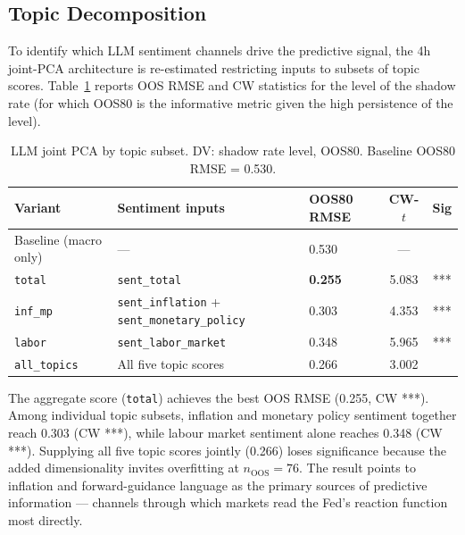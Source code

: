 \subsection{Topic Decomposition}

To identify which LLM sentiment channels drive the predictive signal, the 4h joint-PCA architecture is re-estimated restricting inputs to subsets of topic scores. Table~\ref{tab:topics} reports OOS RMSE and CW statistics for the level of the shadow rate (for which OOS80 is the informative metric given the high persistence of the level).

\begin{table}[ht]
\centering
\caption{LLM joint PCA by topic subset. DV: shadow rate level, OOS80. Baseline OOS80 RMSE = 0.530.}
\label{tab:topics}
\small
\begin{tabular}{lllcc}
\toprule
Variant & Sentiment inputs & OOS80 RMSE & CW-$t$ & Sig \\
\midrule
Baseline (macro only)    & —                                                  & 0.530 & —     &     \\
\texttt{total}           & \texttt{sent\_total}                               & \textbf{0.255} & 5.083 & *** \\
\texttt{inf\_mp}         & \texttt{sent\_inflation} + \texttt{sent\_monetary\_policy} & 0.303 & 4.353 & *** \\
\texttt{labor}           & \texttt{sent\_labor\_market}                       & 0.348 & 5.965 & *** \\
\texttt{all\_topics}     & All five topic scores                              & 0.266 & 3.002 &     \\
\bottomrule
\end{tabular}
\end{table}

The aggregate score (\texttt{total}) achieves the best OOS RMSE (0.255, CW ***). Among individual topic subsets, inflation and monetary policy sentiment together reach 0.303 (CW ***), while labour market sentiment alone reaches 0.348 (CW ***). Supplying all five topic scores jointly (0.266) loses significance because the added dimensionality invites overfitting at $n_{\text{OOS}} = 76$. The result points to inflation and forward-guidance language as the primary sources of predictive information --- channels through which markets read the Fed's reaction function most directly.



